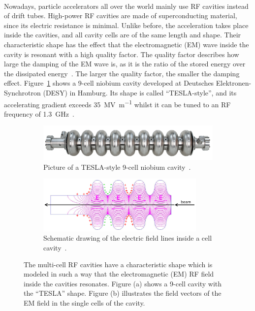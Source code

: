 \\
Nowadays, particle accelerators all over the world mainly use RF cavities instead of drift tubes.
High-power RF cavities are made of superconducting material, since its electric resistance is minimal.
Unlike before, the acceleration takes place inside the cavities, and all cavity cells are of the same length and shape.
Their characteristic shape has the effect that the electromagnetic (EM) wave inside the cavity is resonant with a high quality factor.
The quality factor describes how large the damping of the EM wave is, as it is the ratio of the stored energy over the dissipated energy~\cite[p. 148]{Wilson}.
The larger the quality factor, the smaller the damping effect.
Figure~\ref{fig:Tesla_Cavity} shows a 9-cell niobium cavity developed at Deutsches Elektronen-Synchrotron (DESY) in Hamburg.
Its shape is called ``TESLA-style'', and its accelerating gradient exceeds \SI{35}{\mega\volt\per\meter} whilst it can be tuned to an RF frequency of \SI{1.3}{\giga\hertz}~\cite[p. 15f]{TDR31}.
\begin{figure}
\begin{subfigure}[b]{0.49\textwidth}
\centering
 \includegraphics[width=\textwidth]{Figures/Tesla_Cavity.jpg}
\caption[Tesla-style 9-cell cavity]{Picture of a TESLA-style 9-cell niobium cavity~\cite[p. 15]{TDR31}.}
\label{fig:Tesla_Cavity}
\end{subfigure}\hfill
\begin{subfigure}[b]{0.49\textwidth}
\centering
 \includegraphics[width=0.9\textwidth]{Figures/Cavity.png}
\caption[Electric field in a cell cavity]{Schematic drawing of the electric field lines inside a cell cavity~\cite[p. 47]{Desy_SummerStudent_Lecture}.}
\label{fig:Cavity}
\end{subfigure}
\caption[RF cavities]{The multi-cell RF cavities have a characteristic shape which is modeled in such a way that the electromagnetic (EM) RF field inside the cavities resonates. Figure (a) shows a 9-cell cavity with the ``TESLA'' shape. Figure (b) illustrates the field vectors of the EM field in the single cells of the cavity.}
\label{fig:Cavities}
\end{figure}
